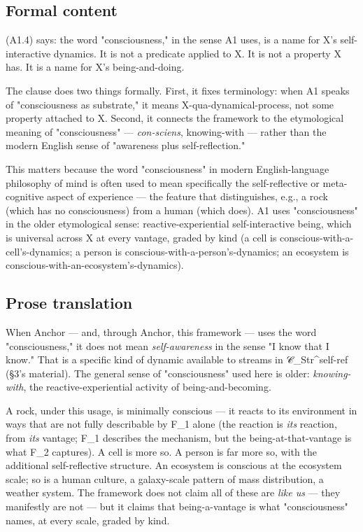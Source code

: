 \documentclass[11pt, openany]{book}
\begin{document}
\subsection{Formal content}

(A1.4) says: the word "consciousness," in the sense A1 uses, is a name for X's self-interactive dynamics. It is not a predicate applied to X. It is not a property X has. It is a name for X's being-and-doing.

The clause does two things formally. First, it fixes terminology: when A1 speaks of "consciousness as substrate," it means X-qua-dynamical-process, not some property attached to X. Second, it connects the framework to the etymological meaning of "consciousness" --- \textit{con-sciens}, knowing-with --- rather than the modern English sense of "awareness plus self-reflection."

This matters because the word "consciousness" in modern English-language philosophy of mind is often used to mean specifically the self-reflective or meta-cognitive aspect of experience --- the feature that distinguishes, e.g., a rock (which has no consciousness) from a human (which does). A1 uses "consciousness" in the older etymological sense: reactive-experiential self-interactive being, which is universal across X at every vantage, graded by kind (a cell is conscious-with-a-cell's-dynamics; a person is conscious-with-a-person's-dynamics; an ecosystem is conscious-with-an-ecosystem's-dynamics).

\subsection{Prose translation}

When Anchor --- and, through Anchor, this framework --- uses the word "consciousness," it does not mean \textit{self-awareness} in the sense "I know that I know." That is a specific kind of dynamic available to streams in 𝒞\_\allowbreak{}Str\textasciicircum{}self-ref (§3's material). The general sense of "consciousness" used here is older: \textit{knowing-with}, the reactive-experiential activity of being-and-becoming.

A rock, under this usage, is minimally conscious --- it reacts to its environment in ways that are not fully describable by F\_\allowbreak{}1 alone (the reaction is \textit{its} reaction, from \textit{its} vantage; F\_\allowbreak{}1 describes the mechanism, but the being-at-that-vantage is what F\_\allowbreak{}2 captures). A cell is more so. A person is far more so, with the additional self-reflective structure. An ecosystem is conscious at the ecosystem scale; so is a human culture, a galaxy-scale pattern of mass distribution, a weather system. The framework does not claim all of these are \textit{like us} --- they manifestly are not --- but it claims that being-a-vantage is what "consciousness" names, at every scale, graded by kind.
\end{document}
